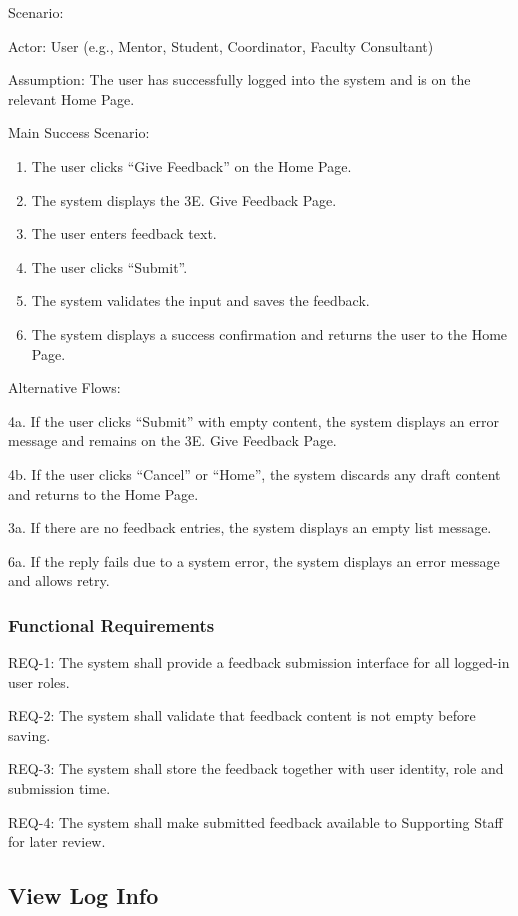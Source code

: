 Scenario:

Actor: User (e.g., Mentor, Student, Coordinator, Faculty Consultant)

Assumption: The user has successfully logged into the system and is on the relevant Home Page.

Main Success Scenario:
\begin{enumerate}
\item The user clicks ``Give Feedback'' on the Home Page.
\item The system displays the 3E. Give Feedback Page.
\item The user enters feedback text.
\item The user clicks ``Submit''.
\item The system validates the input and saves the feedback.
\item The system displays a success confirmation and returns the user to the Home Page.
\end{enumerate}

Alternative Flows:

4a. If the user clicks ``Submit'' with empty content, the system displays an error message and remains on the 3E. Give Feedback Page.

4b. If the user clicks ``Cancel'' or ``Home'', the system discards any draft content and returns to the Home Page.

3a. If there are no feedback entries, the system displays an empty list message.

6a. If the reply fails due to a system error, the system displays an error message and allows retry.

\subsubsection{Functional Requirements}

REQ-1: The system shall provide a feedback submission interface for all logged-in user roles.

REQ-2: The system shall validate that feedback content is not empty before saving.

REQ-3: The system shall store the feedback together with user identity, role and submission time.

REQ-4: The system shall make submitted feedback available to Supporting Staff for later review.

\subsection{View Log Info}


